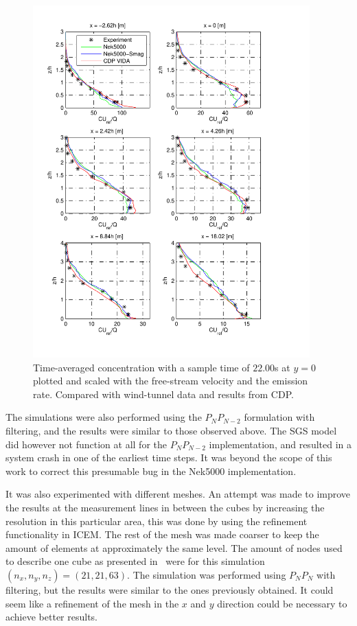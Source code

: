 \begin{figure}[h]
    \centering
    \includegraphics[width=0.95\textwidth]{Figures/NekcV_all.pdf}
    \caption{Time-averaged concentration with a sample time of $22.00$s at $y = 0$ plotted
    and scaled with the free-stream velocity and the emission rate. Compared with wind-tunnel data
    and results from CDP.}
    \label{fig:cVall}
\end{figure}
The simulations were also performed using the $P_NP_{N-2}$ formulation with filtering, and the 
results were similar to those observed above. The SGS model did however not function at all for 
the $P_NP_{N-2}$ implementation, and resulted in a system crash in one of the earliest time steps.
It was beyond the scope of this work to correct this presumable bug in the Nek5000 implementation. 

It was also experimented with different meshes. An attempt was made to improve the 
results at the measurement lines in between the cubes by increasing the resolution in
this particular area, this was done by using the refinement functionality in ICEM.
The rest of the mesh was made coarser to keep the amount of elements at approximately the 
same level. The amount of nodes used to describe one cube as presented in~ 
were for this simulation $(n_x,n_y,n_z) = (21,21,63)$.
The simulation was performed using $P_NP_N$ with filtering, but the results were 
similar to the ones previously obtained. It could seem like a refinement of the 
mesh in the $x$ and $y$ direction could be necessary to achieve better results. 

